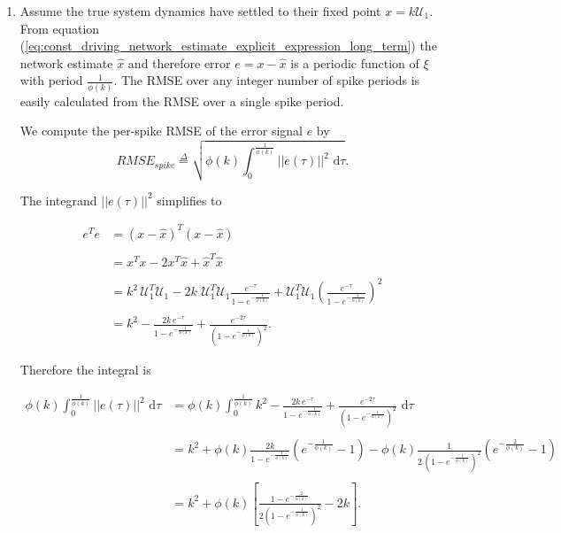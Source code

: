 \begin{enumerate}
\clearpage

\item Assume the true system dynamics have settled to their fixed point $x = k \mathcal{U}_1$. From equation (\ref{eq:const_driving_network_estimate_explicit_expression_long_term}) the network estimate $\hat{x}$ and therefore error $e = x - \hat{x}$ is a periodic function of $\xi$ with period $\frac{1}{\phi(k)}$. The RMSE over any integer number of spike periods is easily calculated from the RMSE over a single spike period. 

We compute the per-spike RMSE of the error signal  $e$ by 
\begin{equation}
\label{eq:per_spike_rmse_def}
RMSE_{spike} \overset{\Delta}{=} \sqrt{\phi(k) \int_{0}^{\frac{1}{\phi(k)}} \!  ||e(\tau)||^2 \, \, \mathrm{d}\tau}.
\end{equation}

The integrand $||e(\tau)||^2$ simplifies to 

\begin{align*}
e^T e &= (x - \hat{x})^T (x - \hat{x}) \\
\\
&= x^T x - 2 x^T \hat{x} + \hat{x}^T \hat{x} \\
\\
&= k^2 \, \mathcal{U}_1 ^T \mathcal{U}_1 - 2 k \, \,  \mathcal{U}_1^T \mathcal{U}_1 \frac{e^{- \tau}}{1 - e^{-\frac{1}{\phi(k)}}} 
+ 
\mathcal{U}_1^T \mathcal{U}_1  \left(\frac{e^{- \tau}}{1 - e^{-\frac{1}{\phi(k)}}} \right)^2\\
\\
&= k^2 - \frac{ 2 k \, e^{- \tau}}{1 - e^{-\frac{1}{\phi(k)}}} 
+ 
\frac{e^{- 2\tau}}{\left(1 - e^{-\frac{1}{\phi(k)}}\right)^2}.
\end{align*}

Therefore the integral is

\begin{align*}
\phi(k)\int_{0}^{\frac{1}{\phi(k)}} \!  ||e(\tau)||^2 \, \, \mathrm{d}\tau &= 
\phi(k)\int_{0}^{\frac{1}{\phi(k)}} \!  
k^2 - \frac{ 2 k \, e^{- \tau}}{1 - e^{-\frac{1}{\phi(k)}}} 
+ 
\frac{e^{- 2\tau}}{\left(1 - e^{-\frac{1}{\phi(k)}}\right)^2}
\, \, \mathrm{d}\tau\\
\\
&= k^2 + \phi(k) \frac{2 k }{1 - e^{-\frac{1}{\phi(k)}}} \left( e^{- \frac{1}{\phi(k)}} - 1 \right) 
- \phi(k) \frac{1}{ 2 \, \left(1 - e^{-\frac{1}{\phi(k)}}\right)^2} 
\left( e^{ -  \frac{2}{\phi(k)}} - 1 \right) \\
\\
&= k^2  + \phi(k) \left[ \frac{1 - e^{-\frac{2}{\phi(k)}}}{2 \left(1 - e^{-\frac{1}{\phi(k)}} \right)^2}  -2 k \right]  .
\end{align*}



\end{enumerate}
